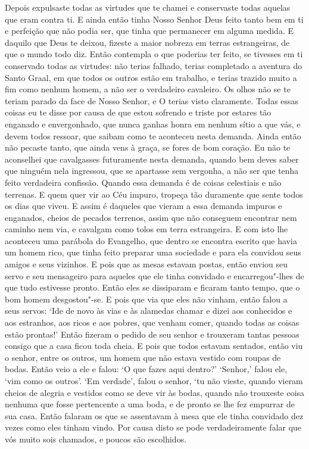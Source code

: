 Depois expulsaste todas as virtudes que te chamei e conservaste todas
aquelas que eram contra ti. E ainda então tinha Nosso Senhor Deus feito tanto
bem em ti e perfeição que não podia ser, que tinha que permanecer em alguma
medida. E daquilo que Deus te deixou, fizeste a maior nobreza em terras
estrangeiras, de que o mundo todo diz. Então contempla o que poderias ter
feito, se tivesses em ti conservado todas as virtudes: não terias falhado,
terias completado a aventura do Santo Graal, em que todos os outros estão em
trabalho, e terias trazido muito a fim como nenhum homem, a não ser o
verdadeiro cavaleiro. Os olhos não se te teriam parado da face de Nosso Senhor,
e O terias visto claramente. Todas essas coisas eu te disse por causa de que
estou sofrendo e triste por estares tão enganado e envergonhado, que nunca
ganhas honra em nenhum sítio a que vás, e devem todos ressoar, que saibam como
te aconteceu nesta demanda. Ainda então não pecaste tanto, que ainda vens à
graça, se fores de bom coração. Eu não te aconselhei que cavalgasses
futuramente nesta demanda, quando bem deves saber que ninguém nela ingressou,
que se apartasse sem vergonha, a não ser que tenha feito verdadeira confissão.
Quando essa demanda é de coisas celestiais e não terrenas. E quem quer vir ao
Céu impuro, tropeça tão duramente que sente todos os dias que viveu. E assim é
daqueles que vieram a essa demanda impuros e enganados, cheios de pecados
terrenos, assim que não conseguem encontrar nem caminho nem via, e cavalgam
como tolos em terra estrangeira. E com isto lhe aconteceu uma parábola do
Evangelho, que dentro se encontra escrito que havia um homem rico, que tinha
feito preparar uma sociedade e para ela convidou seus amigos e seus vizinhos. E
pois que as mesas estavam postas, então enviou seu servo e seu mensageiro para
aqueles que ele tinha convidado e encarregou"-lhes de que tudo estivesse pronto.
Então eles se dissiparam e ficaram tanto tempo, que o bom homem desgostou"-se. E
pois que via que eles não vinham, então falou a seus servos: ‘Ide de novo às
vias e às alamedas chamar e dizei aos conhecidos e aos estranhos, aos ricos e
aos pobres, que venham comer, quando todas as coisas estão prontas!’ Então
fizeram o pedido de seu senhor e trouxeram tantas pessoas consigo que a casa
ficou toda cheia. E pois que todos estavam sentados, então viu o senhor, entre
os outros, um homem que não estava vestido com roupas de bodas. Então veio a
ele e falou: ‘O que fazes aqui dentro?’ ‘Senhor,’ falou ele, ‘vim como os
outros’. ‘Em verdade’, falou o senhor, ‘tu não vieste, quando vieram cheios de
alegria e vestidos como se deve vir às bodas, quando não trouxeste coisa
nenhuma que fosse pertencente a uma boda, e de pronto se lhe fez empurrar de
sua casa. Então falaram os que se assentavam à mesa que ele tinha convidado dez
vezes como eles tinham vindo. Por causa disto se pode verdadeiramente falar que
vós muito sois chamados, e poucos são escolhidos. 

